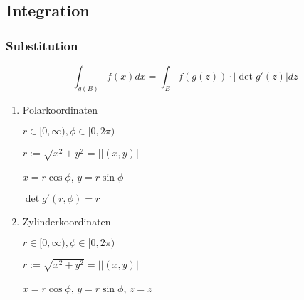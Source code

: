 \documentclass[twoside]{article}
\begin{document}
		\subsection{Integration}
		
			\subsubsection{Substitution}
			
				\begin{displaymath}
					\int_{g(B)} f(x) dx = \int_{B} f(g(z)) \cdot |\det g'(z)| dz
				\end{displaymath}
			
				\begin{enumerate}[1.]
					\item Polarkoordinaten
						
						\begin{math} r \in [0, \infty), \phi \in [0, 2\pi) \end{math}
						
						\begin{math} r := \sqrt{x^2 + y^2} = ||(x,y)|| \end{math}
						
						\begin{math} x = r \cos \phi \end{math},
						\begin{math} y = r \sin \phi \end{math}
						
						\begin{math} \det g'(r, \phi) = r \end{math}
							
					\item Zylinderkoordinaten
						
						\begin{math} r \in [0, \infty), \phi \in [0, 2\pi) \end{math}
						
						\begin{math} r := \sqrt{x^2 + y^2} = ||(x,y)|| \end{math}
						
						\begin{math} x = r \cos \phi \end{math},
						\begin{math} y = r \sin \phi \end{math},
						\begin{math} z = z \end{math}
						

\end{enumerate}
\end{document}
